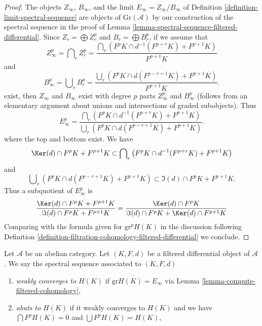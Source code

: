 \begin{proof}
The objects $Z_\infty$, $B_\infty$, and the limit
$E_\infty = Z_\infty/B_\infty$ of
Definition \ref{definition-limit-spectral-sequence}
are objects of $\text{Gr}(\mathcal{A})$ by our construction of
the spectral sequence in the proof of
Lemma \ref{lemma-spectral-sequence-filtered-differential}.
Since $Z_r = \bigoplus Z_r^p$ and $B_r = \bigoplus B_r^p$, if we assume that
$$
Z_\infty^p = \bigcap\nolimits_r Z_r^p =
\frac{\bigcap_r (F^pK \cap d^{-1}(F^{p + r}K) + F^{p + 1}K)}{F^{p + 1}K}
$$
and
$$
B_\infty^p = \bigcup\nolimits_r B_r^p =
\frac{\bigcup_r (F^pK \cap d(F^{p - r + 1}K) + F^{p + 1}K)}{F^{p + 1}K}.
$$
exist, then $Z_\infty$ and $B_\infty$ exist with degree $p$ parts
$Z_\infty^p$ and $B_\infty^p$ (follows from an elementary argument
about unions and intersections of graded subobjects). Thus
$$
E_\infty^p =
\frac{\bigcap_r (F^pK \cap d^{-1}(F^{p + r}K) + F^{p + 1}K)}
{\bigcup_r (F^pK \cap d(F^{p - r + 1}K) + F^{p + 1}K)}.
$$
where the top and bottom exist. We have
\begin{equation}
\label{equation-on-top}
\Ker(d) \cap F^pK + F^{p + 1}K
\subset
\bigcap\nolimits_r \left(F^pK \cap d^{-1}(F^{p + r}K) + F^{p + 1}K\right)
\end{equation}
and
\begin{equation}
\label{equation-at-bottom}
\bigcup\nolimits_r \left(F^pK \cap d(F^{p - r + 1}K) + F^{p + 1}K\right)
\subset
\Im(d) \cap F^pK + F^{p + 1}K.
\end{equation}
Thus a subquotient of $E_\infty^p$ is
$$
\frac{\Ker(d) \cap F^pK + F^{p + 1}K}{\Im(d) \cap F^pK + F^{p + 1}K} =
\frac{\Ker(d) \cap F^pK}{\Im(d) \cap F^pK + \Ker(d) \cap F^{p + 1}K}
$$
Comparing with the formula given for $\text{gr}^pH(K)$ in the discussion
following
Definition \ref{definition-filtration-cohomology-filtered-differential}
we conclude.
\end{proof}

\begin{definition}
\label{definition-filtered-differential-ss-converges}
Let $\mathcal{A}$ be an abelian category.
Let $(K, F, d)$ be a filtered differential object of $\mathcal{A}$.
We say the spectral sequence associated to $(K, F, d)$
\begin{enumerate}
\item {\it weakly converges to $H(K)$} if $\text{gr}H(K) = E_{\infty}$
via Lemma \ref{lemma-compute-filtered-cohomology},
\item {\it abuts to $H(K)$} if it weakly converges to $H(K)$ and
we have $\bigcap F^pH(K) = 0$ and $\bigcup F^pH(K) = H(K)$,
\end{enumerate}
\end{definition}

